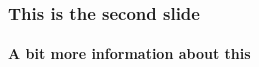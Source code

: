 \begin{frame}
  \frametitle{This is the second slide}
  \framesubtitle{A bit more information about this}
\end{frame}
